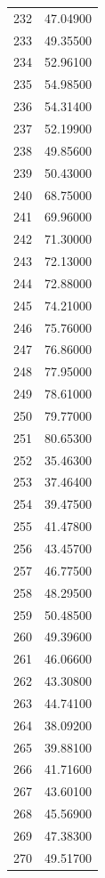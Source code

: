 \documentclass[
  letterpaper,
  DIV=11,
  numbers=noendperiod]{scrreprt}
\begin{document}
\begin{tcolorbox}
\begin{tabular}{lr}
232  &         47.04900 \\
233  &         49.35500 \\
234  &         52.96100 \\
235  &         54.98500 \\
236  &         54.31400 \\
237  &         52.19900 \\
238  &         49.85600 \\
239  &         50.43000 \\
240  &         68.75000 \\
241  &         69.96000 \\
242  &         71.30000 \\
243  &         72.13000 \\
244  &         72.88000 \\
245  &         74.21000 \\
246  &         75.76000 \\
247  &         76.86000 \\
248  &         77.95000 \\
249  &         78.61000 \\
250  &         79.77000 \\
251  &         80.65300 \\
252  &         35.46300 \\
253  &         37.46400 \\
254  &         39.47500 \\
255  &         41.47800 \\
256  &         43.45700 \\
257  &         46.77500 \\
258  &         48.29500 \\
259  &         50.48500 \\
260  &         49.39600 \\
261  &         46.06600 \\
262  &         43.30800 \\
263  &         44.74100 \\
264  &         38.09200 \\
265  &         39.88100 \\
266  &         41.71600 \\
267  &         43.60100 \\
268  &         45.56900 \\
269  &         47.38300 \\
270  &         49.51700 \\

\end{tabular}
\end{tcolorbox}
\end{document}
